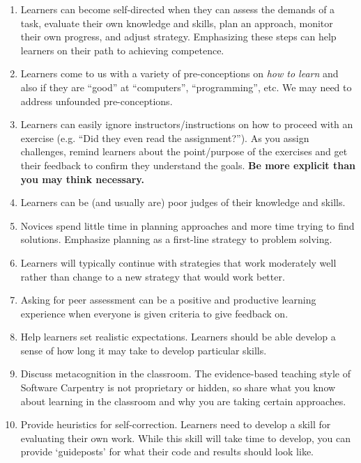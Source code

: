 \begin{enumerate}
\def\labelenumi{\arabic{enumi}.}
\itemsep1pt\parskip0pt
\item
  Learners can become self-directed when they can assess the demands of
  a task, evaluate their own knowledge and skills, plan an approach,
  monitor their own progress, and adjust strategy. Emphasizing these
  steps can help learners on their path to achieving competence.
\item
  Learners come to us with a variety of pre-conceptions on \emph{how to
  learn} and also if they are ``good'' at ``computers'',
  ``programming'', etc. We may need to address unfounded
  pre-conceptions.
\item
  Learners can easily ignore instructors/instructions on how to proceed
  with an exercise (e.g. ``Did they even read the assignment?''). As you
  assign challenges, remind learners about the point/purpose of the
  exercises and get their feedback to confirm they understand the goals.
  \textbf{Be more explicit than you may think necessary.}
\item
  Learners can be (and usually are) poor judges of their knowledge and
  skills.
\item
  Novices spend little time in planning approaches and more time trying
  to find solutions. Emphasize planning as a first-line strategy to
  problem solving.
\item
  Learners will typically continue with strategies that work moderately
  well rather than change to a new strategy that would work better.
\item
  Asking for peer assessment can be a positive and productive learning
  experience when everyone is given criteria to give feedback on.
\item
  Help learners set realistic expectations. Learners should be able
  develop a sense of how long it may take to develop particular skills.
\item
  Discuss metacognition in the classroom. The evidence-based teaching
  style of Software Carpentry is not proprietary or hidden, so share
  what you know about learning in the classroom and why you are taking
  certain approaches.
\item
  Provide heuristics for self-correction. Learners need to develop a
  skill for evaluating their own work. While this skill will take time
  to develop, you can provide `guideposts' for what their code and
  results should look like.
\end{enumerate}

